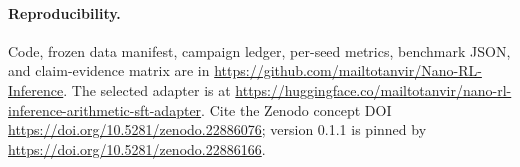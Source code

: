 \documentclass[10pt]{article}
\begin{document}
\paragraph{Reproducibility.} Code, frozen data manifest, campaign ledger, per-seed metrics, benchmark JSON, and claim-evidence matrix are in \url{https://github.com/mailtotanvir/Nano-RL-Inference}. The selected adapter is at \url{https://huggingface.co/mailtotanvir/nano-rl-inference-arithmetic-sft-adapter}. Cite the Zenodo concept DOI \url{https://doi.org/10.5281/zenodo.22886076}; version 0.1.1 is pinned by \url{https://doi.org/10.5281/zenodo.22886166}.
\end{document}
